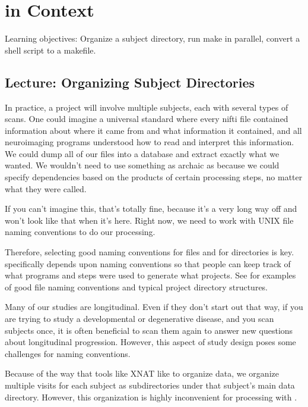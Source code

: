 \chapter{\maken{} in Context}
\label{sec:practicum2}
Learning objectives: Organize a subject directory, run make in parallel, convert a shell script to a makefile.
\section{Lecture: Organizing Subject Directories}

In practice, a project will involve multiple subjects, each with
several types of scans. One could imagine a universal standard where
every nifti file contained information about where it came from and
what information it contained, and all neuroimaging programs
understood how to read and interpret this information. We could dump
all of our files into a database and extract exactly what we
wanted. We wouldn't need to use something as archaic as \maken{} because
we could specify dependencies based on the products of certain
processing steps, no matter what they were called.

If you can't imagine this, that's totally fine, because it's a very
long way off and won't look like that when it's here. Right now, we
need to work with UNIX file naming conventions to do our processing.

Therefore, selecting good naming conventions for files and for
directories is key. \maken{} specifically depends upon naming
conventions so that people can keep track of what programs and steps
were used to generate what projects. See  for examples of good file naming conventions and typical project directory structures. 


Many of our studies are longitudinal. Even if they don't start out
that way, if you are trying to study a developmental or degenerative
disease, and you scan subjects once, it is often beneficial to scan
them again to answer new questions about longitudinal
progression. However, this aspect of study design poses some
challenges for naming conventions. 

Because of the way that tools like XNAT like to organize data, we
organize multiple visits for each subject as subdirectories under that
subject's main data directory. However, this organization is highly
inconvenient for processing with \maken{}.  


